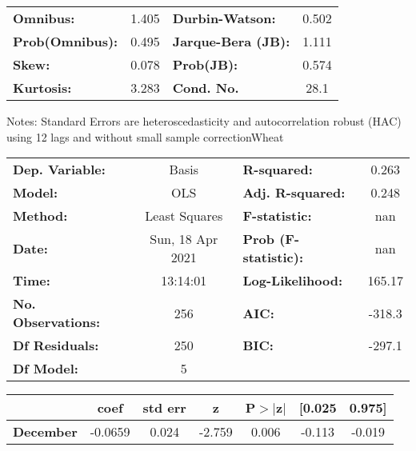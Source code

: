 \begin{center}
\begin{tabular}{lcccccc}
\bottomrule
\end{tabular}
\begin{tabular}{lclc}
\textbf{Omnibus:}       &  1.405 & \textbf{  Durbin-Watson:     } &    0.502  \\
\textbf{Prob(Omnibus):} &  0.495 & \textbf{  Jarque-Bera (JB):  } &    1.111  \\
\textbf{Skew:}          &  0.078 & \textbf{  Prob(JB):          } &    0.574  \\
\textbf{Kurtosis:}      &  3.283 & \textbf{  Cond. No.          } &     28.1  \\
\bottomrule
\end{tabular}
\end{center}

Notes: \newline
 [1] Standard Errors are heteroscedasticity and autocorrelation robust (HAC) using 12 lags and without small sample correctionWheat\begin{center}
\begin{tabular}{lclc}
\toprule
\textbf{Dep. Variable:}    &      Basis       & \textbf{  R-squared:         } &     0.263   \\
\textbf{Model:}            &       OLS        & \textbf{  Adj. R-squared:    } &     0.248   \\
\textbf{Method:}           &  Least Squares   & \textbf{  F-statistic:       } &       nan   \\
\textbf{Date:}             & Sun, 18 Apr 2021 & \textbf{  Prob (F-statistic):} &      nan    \\
\textbf{Time:}             &     13:14:01     & \textbf{  Log-Likelihood:    } &    165.17   \\
\textbf{No. Observations:} &         256      & \textbf{  AIC:               } &    -318.3   \\
\textbf{Df Residuals:}     &         250      & \textbf{  BIC:               } &    -297.1   \\
\textbf{Df Model:}         &           5      & \textbf{                     } &             \\
\bottomrule
\end{tabular}
\begin{tabular}{lcccccc}
                   & \textbf{coef} & \textbf{std err} & \textbf{z} & \textbf{P$> |$z$|$} & \textbf{[0.025} & \textbf{0.975]}  \\
\midrule
\textbf{December}  &      -0.0659  &        0.024     &    -2.759  &         0.006        &       -0.113    &       -0.019     \\

\end{tabular}
\end{center}
